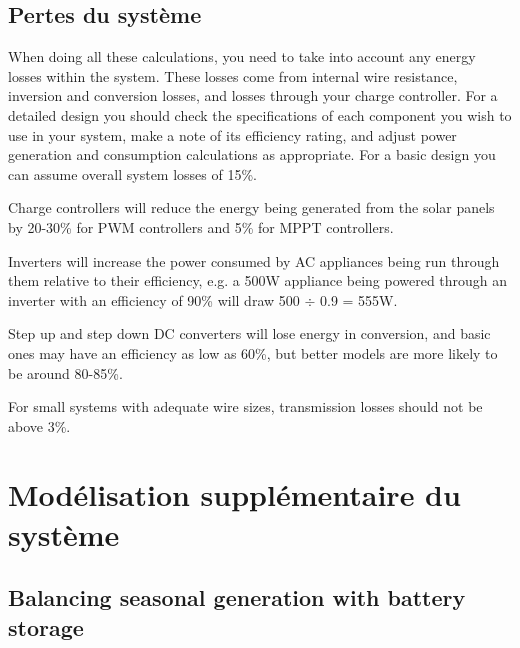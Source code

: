 \documentclass{article}
\theoremstyle{definition}
\theoremstyle{definition}
\theoremstyle{remark}
\begin{document}

  {\color{blue}\subsection{Pertes du système}} %
  \label{sub:pertes_du_systeme}

    When doing all these calculations, you need to take into account any energy losses within the system. These losses come from internal wire resistance, inversion and conversion losses, and losses through your charge controller. For a detailed design you should check the specifications of each component you wish to use in your system, make a note of its efficiency rating, and adjust power generation and consumption calculations as appropriate. For a basic design you can assume overall system losses of 15\%.

    Charge controllers will reduce the energy being generated from the solar panels by 20-30\% for PWM controllers and 5\% for MPPT controllers. 

    Inverters will increase the power consumed by AC appliances being run through them relative to their efficiency, e.g. a 500W appliance being powered through an inverter with an efficiency of 90\% will draw 500 \(\div\) 0.9 = 555W.

    Step up and step down DC converters will lose energy in conversion, and basic ones may have an efficiency as low as 60\%, but better models are more likely to be around 80-85\%. 

    For small systems with adequate wire sizes, transmission losses should not be above 3\%.  
  


{\color{blue}\section{Modélisation supplémentaire du système}} %
\label{sec:modelisation_supplementaire_du_systeme}

  {\color{blue}\subsection{Balancing seasonal generation with battery storage}} %
  \label{sub:balancing_seasonal_generation_with_battery_storage}
\end{document}
